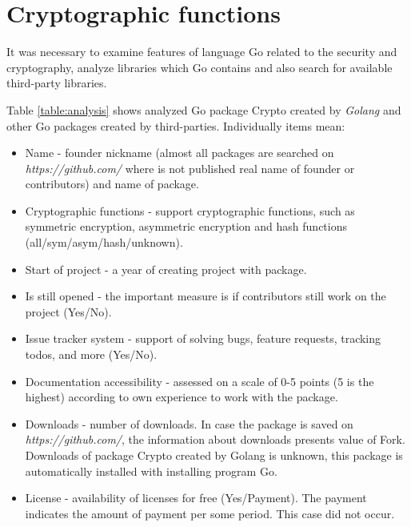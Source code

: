 \documentclass[
  digital, %
  notable,   %
  lof,     %
  lot,     %
]{fithesis3}
\begin{document}
\section{Cryptographic functions}
It was necessary to examine features of language Go related to the security and cryptography, analyze 
libraries which Go contains and also search for available third-party libraries. 

Table \ref{table:analysis} shows analyzed Go package Crypto created by \textit{Golang} and other Go 
packages created by third-parties. Individually items mean:
\vskip0.1in
\begin{itemize}[leftmargin=2em,rightmargin=1em,itemsep=0.75\parskip,parsep=0em,topsep=0em,partopsep=0em]
\item Name - founder nickname (almost all packages are searched on \textit{https://github.com/} where is not published real name of founder or contributors) and name of package.
\item Cryptographic functions - support cryptographic functions, such as symmetric encryption, asymmetric encryption and hash functions (all/sym/asym/hash/unknown).
\item Start of project - a year of creating project with package.
\item Is still opened - the important measure is if contributors still work on the project (Yes/No).
\item Issue tracker system - support of solving bugs, feature requests, tracking todos, and more (Yes/No).
\item Documentation accessibility - assessed on a scale of 0-5 points (5 is the highest) according to own experience to work with the package.
\item Downloads - number of downloads. In case the package is saved on \textit{https://github.com/}, the information about downloads presents value of Fork. Downloads of package Crypto created by Golang is unknown, this package is automatically installed with installing program Go.  
\item License - availability of licenses for free (Yes/Payment). The payment indicates the amount of payment per some period. This case did not occur.
\end{itemize}
\vskip0.1in
\end{document}
